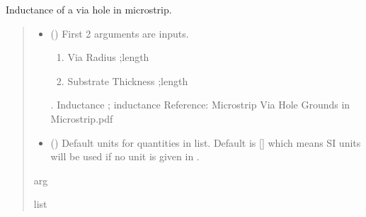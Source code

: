\documentclass[letterpaper,10pt,english]{sphinxmanual}
\begin{document}

\begin{fulllineitems}
\label{\detokenize{components:components.L_microstrip_via_hole}}
\pysigstartsignatures
{}
\pysigstopsignatures
\sphinxAtStartPar
Inductance of a via hole in microstrip.
\begin{quote}\begin{description}
\begin{itemize}
\item {}
\sphinxAtStartPar
{} () \textendash{}
\sphinxAtStartPar
First 2 arguments are inputs.
\begin{enumerate}
%
\item {}
\sphinxAtStartPar
Via Radius ;length

\item {}
\sphinxAtStartPar
Substrate Thickness ;length

\end{enumerate}

. Inductance ; inductance
Reference:  Microstrip Via Hole Grounds in Microstrip.pdf


\item {}
\sphinxAtStartPar
{} (\sphinxstyleliteralemphasis{\sphinxupquote{, }}) \textendash{} Default units for quantities in  list. Default is {[}{]} which means SI units will be used if no unit is given in .

\end{itemize}

\sphinxAtStartPar
arg

\sphinxAtStartPar
list

\end{description}\end{quote}

\end{fulllineitems}
\end{document}
